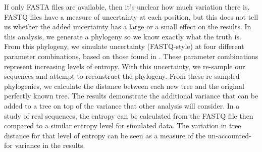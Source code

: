 \documentclass[
]{article}
\begin{document}
If only FASTA files are available, then it's unclear how much variation
there is. FASTQ files have a measure of uncertainty at each position,
but this does not tell us whether the added uncertainty has a large or a
small effect on the results. In this analysis, we generate a phylogeny
so we know exactly what the truth is. From this phylogeny, we simulate
uncertainty (FASTQ-style) at four different parameter combinations,
based on those found in \citet{Zanini}. These parameter combinations
represent increasing levels of entropy. With this uncertainty, we
re-sample our sequences and attempt to reconstruct the phylogeny. From
these re-sampled phylogenies, we calculate the distance between each new
tree and the original perfectly known tree. The results demonstrate the
additional variance that can be added to a tree on top of the variance
that other analysis will consider. In a study of real sequences, the
entropy can be calculated from the FASTQ file then compared to a similar
entropy level for simulated data. The variation in tree distance for
that level of entropy can be seen as a measure of the un-accounted-for
variance in the results.
\end{document}
